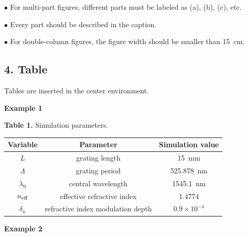 \documentclass{cpbtex}
\begin{document}
\begin{CJK*}{GBK}{song}
\textcolor[rgb]{0.98,0.00,0.00}{$\bullet$ For multi-part figures, different parts must be labeled as (a), (b), (c), etc.}

\textcolor[rgb]{0.98,0.00,0.00}{$\bullet$ Every part should be described in the caption.}

\textcolor[rgb]{0.98,0.00,0.00}{$\bullet$ For double-column figures, the figure width should be smaller than 15~cm.}

\subsection*{4. Table}

Tables are inserted in the center environment\cite{tamm1959general}.

\textbf{Example 1}

\begin{center}
{\footnotesize{\bf Table 1.} Simulation parameters.\\
\vspace{2mm}
\begin{tabular}{ccc}
\hline
{Variable}      & {Parameter}                         & {Simulation value} \\\hline
{$L$}           & {grating length}                    & {15~mm} \\
{$\varLambda$}  & {grating period}                    & {525.878~nm} \\
{$\lambda_0$}   & {central wavelength}                & {1545.1~nm} \\
{$n_{\rm eff}$} & {effective refractive index}        & 1.4774 \\
{$\delta_n$}    & {refractive index modulation depth} & {$0.9\times 10^{-4}$} \\
\hline
\end{tabular}}
\end{center}

\textbf{Example 2}


\end{CJK*}
\end{document}
